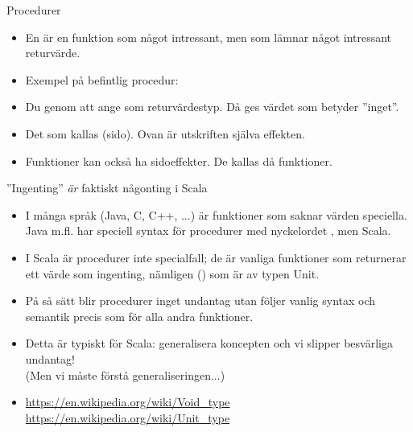 \begin{Slide}{Procedurer}\SlideFontSmall
\begin{itemize}
\item En  är en funktion som  något intressant, men som  lämnar något intressant returvärde.
\item Exempel på befintlig procedur: 
\item Du  genom att ange \texttt{} som returvärdestyp. Då ges värdet \texttt{\Alert{()}} som betyder ''inget''.
\end{itemize}
\begin{itemize}
\item Det som  kallas (sido). Ovan är utskriften själva effekten.
\item Funktioner kan också ha sidoeffekter. De kallas då  funktioner.
\end{itemize}
\end{Slide}

\begin{Slide}{''Ingenting'' \emph{är} faktiskt någonting i Scala}
\begin{itemize}
\item I många språk (Java, C, C++, ...) är funktioner som saknar värden speciella.
 Java m.fl. har speciell syntax för procedurer med nyckelordet , men  Scala. 

\item I Scala är procedurer inte specialfall; de är vanliga funktioner som returnerar ett värde som  ingenting, nämligen () som är av typen Unit. 

\item På så sätt blir procedurer inget undantag utan följer vanlig syntax och semantik precis som för alla andra funktioner.

\item Detta är typiskt för Scala: generalisera koncepten och vi slipper besvärliga undantag! \\(Men vi måste förstå generaliseringen...)


\item [] {\SlideFontSmall 
\url{https://en.wikipedia.org/wiki/Void_type}
\url{https://en.wikipedia.org/wiki/Unit_type}
}

\end{itemize}

\end{Slide}

